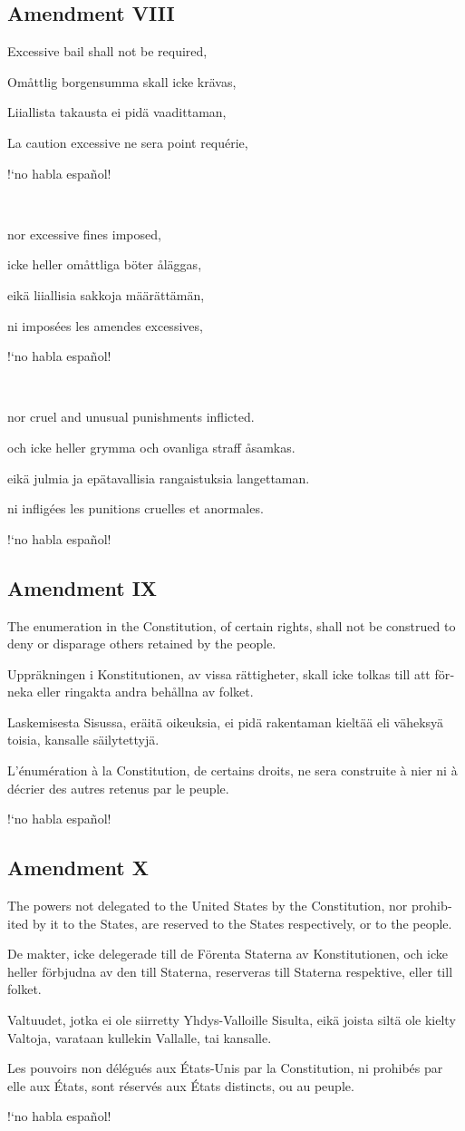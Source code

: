 \documentclass[a4paper,landscape,10pt]{article}
\newcommand{\tblock}[5]{\noindent\begin{minipage}[t]{0.18\textwidth}\foreignlanguage{english}{#1}\end{minipage}\hskip 0.025\textwidth\begin{minipage}[t]{0.18\textwidth}\foreignlanguage{swedish}{#2}\end{minipage}\hskip 0.025\textwidth\begin{minipage}[t]{0.18\textwidth}\foreignlanguage{finnish}{#3}\end{minipage}\hskip 0.025\textwidth\begin{minipage}[t]{0.18\textwidth}\foreignlanguage{french}{#4}\end{minipage}\hskip 0.025\textwidth\begin{minipage}[t]{0.18\textwidth}\foreignlanguage{spanish}{#5}\end{minipage}}
\begin{document}
\subsection*{Amendment VIII}
\tblock
{Excessive bail shall not be required,}
{Omåttlig borgensumma skall icke krävas,}
{Liiallista takausta ei pidä vaadittaman,}
{La caution excessive ne sera point requérie,}
{!`no habla español!}

~

\tblock
{nor excessive fines imposed,}
{icke heller omåttliga böter åläggas,}
{eikä liiallisia sakkoja määrättämän,}
{ni imposées les amendes excessives,}
{!`no habla español!}

~

\tblock
{nor cruel and unusual punishments inflicted.}
{och icke heller grymma och ovanliga straff åsamkas.}
{eikä julmia ja epätavallisia rangaistuksia langettaman.}
{ni infligées les punitions cruelles et anormales.}
{!`no habla español!}

\subsection*{Amendment IX}
\tblock
{The enumeration in the Constitution, of certain rights, shall not be construed to deny or disparage others retained by the people.}
{Uppräkningen i Konstitutionen, av vissa rättigheter, skall icke tolkas till att förneka eller ringakta andra behållna av folket.}
{Laskemisesta Sisussa, eräitä oikeuksia, ei pidä rakentaman kieltää eli väheksyä toisia, kansalle säilytettyjä.}
{L'énumération à la Constitution, de certains droits, ne sera construite à nier ni à décrier des autres retenus par le peuple.}
{!`no habla español!}

\subsection*{Amendment X}
\tblock
{The powers not delegated to the United States by the Constitution, nor prohibited by it to the States, are reserved to the States respectively, or to the people.}
{De makter, icke delegerade till de Förenta Staterna av Konstitutionen, och icke heller förbjudna av den till Staterna, reserveras till Staterna respektive, eller till folket.}
{Valtuudet, jotka ei ole siirretty Yhdys-Valloille Sisulta, eikä joista siltä ole kielty Valtoja, varataan kullekin Vallalle, tai kansalle.}
{Les pouvoirs non délégués aux États-Unis par la Constitution, ni prohibés par elle aux États, sont réservés aux États distincts, ou au peuple.}
{!`no habla español!}
\end{document}
